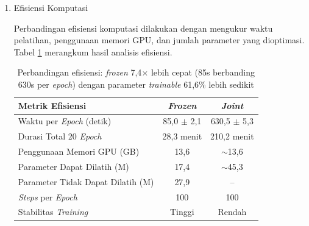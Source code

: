\begin{enumerate}[leftmargin=1.5em, labelsep=0.5em, itemindent=0pt, noitemsep, topsep=0pt, label=\arabic*., leftmargin=0.8cm]
          

    \item Efisiensi Komputasi

          Perbandingan efisiensi komputasi dilakukan dengan mengukur waktu pelatihan, penggunaan memori GPU, dan jumlah parameter yang dioptimasi. Tabel \ref{tab:frozen-vs-joint-efficiency} merangkum hasil analisis efisiensi.

          \begin{table}[!htbp]
              \caption[Efisiensi komputasi frozen berbanding joint]{Perbandingan efisiensi: \textit{frozen} 7,4$\times$ lebih cepat (85s berbanding 630s per \textit{epoch}) dengan parameter \textit{trainable} 61,6\% lebih sedikit}
              \label{tab:frozen-vs-joint-efficiency}
              \begin{tabularx}{\textwidth}{|>{\raggedright\arraybackslash}X|c|c|}
                  \toprule
                  \textbf{Metrik Efisiensi}                     & \textbf{\textit{Frozen}}         & \textbf{\textit{Joint}}           \\
                  \midrule
                  Waktu per \textit{Epoch} (detik)     & 85,0 $\pm$ 2,1 & 630,5 $\pm$ 5,3 \\
                  Durasi Total 20 \textit{Epoch}       & 28,3 menit     & 210,2 menit     \\
                  Penggunaan Memori GPU (GB)           & 13,6           & $\sim$13,6      \\
                  Parameter Dapat Dilatih (M)     & 17,4           & $\sim$45,3      \\
                  Parameter Tidak Dapat Dilatih (M) & 27,9           & --             \\
                  \textit{Steps} per \textit{Epoch}    & 100            & 100             \\
                  Stabilitas \textit{Training}         & Tinggi         & Rendah          \\
                  \bottomrule
              \end{tabularx}
          \end{table}


\end{enumerate}
